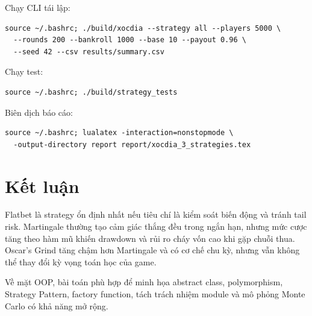 \documentclass[12pt,a4paper]{article}
\begin{document}
Chạy CLI tái lập:
\begin{lstlisting}
source ~/.bashrc; ./build/xocdia --strategy all --players 5000 \
  --rounds 200 --bankroll 1000 --base 10 --payout 0.96 \
  --seed 42 --csv results/summary.csv
\end{lstlisting}

Chạy test:
\begin{lstlisting}
source ~/.bashrc; ./build/strategy_tests
\end{lstlisting}

Biên dịch báo cáo:
\begin{lstlisting}
source ~/.bashrc; lualatex -interaction=nonstopmode \
  -output-directory report report/xocdia_3_strategies.tex
\end{lstlisting}

\section{Kết luận}
Flatbet là strategy ổn định nhất nếu tiêu chí là kiểm soát biến động và tránh tail risk. Martingale thường tạo cảm giác thắng đều trong ngắn hạn, nhưng mức cược tăng theo hàm mũ khiến drawdown và rủi ro cháy vốn cao khi gặp chuỗi thua. Oscar's Grind tăng chậm hơn Martingale và có cơ chế chu kỳ, nhưng vẫn không thể thay đổi kỳ vọng toán học của game.

Về mặt OOP, bài toán phù hợp để minh họa abstract class, polymorphism, Strategy Pattern, factory function, tách trách nhiệm module và mô phỏng Monte Carlo có khả năng mở rộng.
\end{document}
